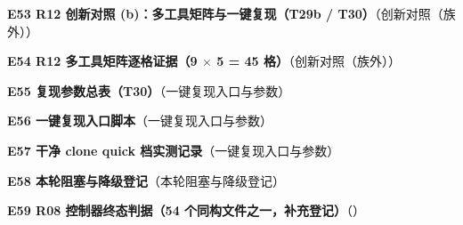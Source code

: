 \documentclass[UTF8,fontset=fandol,11pt,a4paper]{ctexart}
\begin{document}
\begin{samepage}\noindent\textbf{E53 R12 创新对照 (b)：多工具矩阵与一键复现（T29b / T30）}（创新对照（族外））\par\noindent {}\par\vspace{1.5mm}\end{samepage}
\begin{samepage}\noindent\textbf{E54 R12 多工具矩阵逐格证据（9 \texorpdfstring{$\times$}{x} 5 = 45 格）}（创新对照（族外））\par\noindent {}\par\vspace{1.5mm}\end{samepage}
\begin{samepage}\noindent\textbf{E55 复现参数总表（T30）}（一键复现入口与参数）\par\noindent {}\par\vspace{1.5mm}\end{samepage}
\begin{samepage}\noindent\textbf{E56 一键复现入口脚本}（一键复现入口与参数）\par\noindent {}\par\vspace{1.5mm}\end{samepage}
\begin{samepage}\noindent\textbf{E57 干净 clone quick 档实测记录}（一键复现入口与参数）\par\noindent {}\par\vspace{1.5mm}\end{samepage}
\begin{samepage}\noindent\textbf{E58 本轮阻塞与降级登记}（本轮阻塞与降级登记）\par\noindent {}\par\vspace{1.5mm}\end{samepage}
\begin{samepage}\noindent\textbf{E59 R08 控制器终态判据（54 个同构文件之一，补充登记）}（\texttt{}）\par\noindent \texttt{}\par\vspace{1.5mm}\end{samepage}
\end{document}
